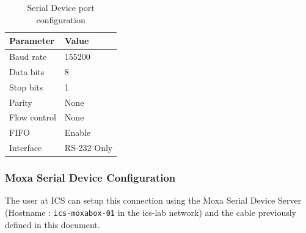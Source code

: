\documentclass[11pt
  , a4paper
  , article
  , oneside
  , showtrims
]{memoir}
\begin{document}
\begin{table}[!htb]
	\centering
	\begin{tabular}{l|l}
		\toprule\rowcolor{gray!15}
		Parameter          & Value                        \\\midrule
		Baud rate          & 155200                       \\\midrule
		Data bits          & 8                            \\\midrule
		Stop bits          & 1                            \\\midrule
		Parity             & None                         \\\midrule
		Flow control       & None                         \\\midrule
		FIFO               & Enable                       \\\midrule
		Interface          & RS-232 Only                  \\\bottomrule
	\end{tabular}
	\caption[]{Serial Device port configuration}
	\label{table:moxa_serial}
\end{table}

\subsubsection{Moxa Serial Device Configuration}
The user at ICS can setup this connection using the Moxa Serial Device Server (Hostname : \texttt{ics-moxabox-01} in the ics-lab network) and the cable previously defined in this document.
\end{document}
